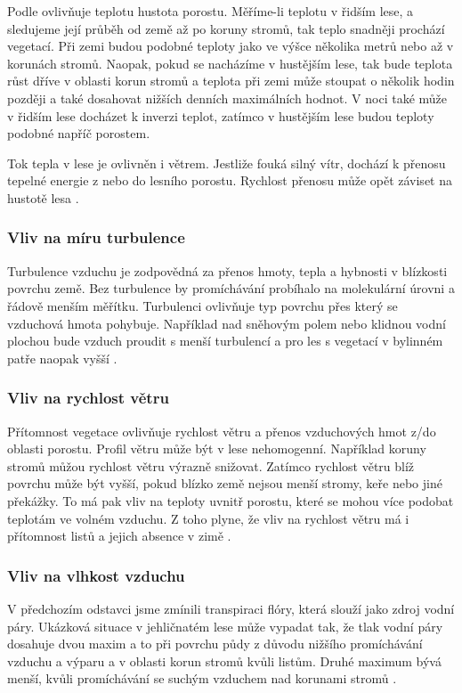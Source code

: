 Podle \parencite{alma} ovlivňuje teplotu hustota porostu. Měříme-li teplotu v řidším lese, a sledujeme její průběh od země až po koruny stromů, tak teplo snadněji prochází vegetací. Při zemi budou podobné teploty jako ve výšce několika metrů nebo až v korunách stromů. Naopak, pokud se nacházíme v hustějším lese, tak bude teplota růst dříve v oblasti korun stromů a teplota při zemi může stoupat o několik hodin později a také dosahovat nižších denních maximálních hodnot. V noci také může v řidším lese docházet k inverzi teplot, zatímco v hustějším lese budou teploty podobné napříč porostem. 

Tok tepla v lese je ovlivněn i větrem. Jestliže fouká silný vítr, dochází k přenosu tepelné energie z nebo do lesního porostu. Rychlost přenosu může opět záviset na hustotě lesa \parencite{alma}. 

\subsubsection{Vliv na míru turbulence}\label{chap:vlivnaturbulenci}
Turbulence vzduchu je zodpovědná za přenos hmoty, tepla a hybnosti v blízkosti povrchu země. Bez turbulence by promíchávání probíhalo na molekulární úrovni a řádově menším měřítku. Turbulenci ovlivňuje typ povrchu přes který se vzduchová hmota pohybuje. Například nad sněhovým polem nebo klidnou vodní plochou bude vzduch proudit s menší turbulencí a pro les s vegetací v bylinném patře naopak vyšší \parencite{alma}. 

\subsubsection{Vliv na rychlost větru}\label{chap:vlivnavitr}
Přítomnost vegetace ovlivňuje rychlost větru a přenos vzduchových hmot z/do oblasti porostu. Profil větru může být v lese nehomogenní. Například koruny stromů můžou rychlost větru výrazně snižovat. Zatímco rychlost větru blíž povrchu může být vyšší, pokud blízko země nejsou menší stromy, keře nebo jiné překážky. To má pak vliv na teploty uvnitř porostu, které se mohou více podobat teplotám ve volném vzduchu. Z toho plyne, že vliv na rychlost větru má i přítomnost listů a jejich absence v zimě \parencite{alma}. 

\subsubsection{Vliv na vlhkost vzduchu}
V předchozím odstavci jsme zmínili transpiraci flóry, která slouží jako zdroj vodní páry. Ukázková situace v jehličnatém lese může vypadat tak, že tlak vodní páry dosahuje dvou maxim a to při povrchu půdy z důvodu nižšího promíchávání vzduchu a výparu a v oblasti korun stromů kvůli listům. Druhé maximum bývá menší, kvůli promíchávání se suchým vzduchem nad korunami stromů \parencite{alma}. 

